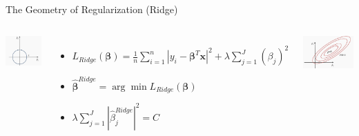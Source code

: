 \begin{frame}{The Geometry of Regularization (Ridge)}

\begin{columns}
    \includegraphics[width=\linewidth]{images/linear-regression/linear-regression-28.png}

    \begin{itemize}
        \item $L_{Ridge}(\boldsymbol{\beta}) = \frac{1}{n} \sum_{i=1}^n \left| y_i - \boldsymbol{\beta}^T \boldsymbol{x} \right|^2 + \lambda \sum_{j=1}^J (\beta_j)^2$
        \item $\hat{\boldsymbol{\beta}}^{Ridge} = \arg\min L_{Ridge}(\boldsymbol{\beta})$
        \item $\lambda \sum_{j=1}^J \left| \hat{\beta}_j^{Ridge} \right|^2 = C$
    \end{itemize}

    \includegraphics[width=\linewidth]{images/linear-regression/linear-regression-29.png}


\end{columns}
\end{frame}
